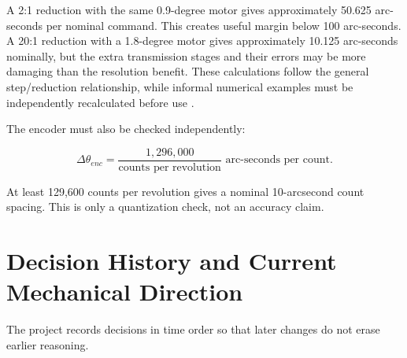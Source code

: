 \documentclass[11pt,a4paper]{article}
\begin{document}
A 2:1 reduction with the same 0.9-degree motor gives approximately 50.625 arc-seconds per nominal command. This creates useful margin below 100 arc-seconds. A 20:1 reduction with a 1.8-degree motor gives approximately 10.125 arc-seconds nominally, but the extra transmission stages and their errors may be more damaging than the resolution benefit. These calculations follow the general step/reduction relationship, while informal numerical examples must be independently recalculated before use \cite{cloudynights}.

The encoder must also be checked independently:

\begin{equation}
\Delta\theta_{enc}=\frac{1,296,000}{\text{counts per revolution}}\text{ arc-seconds per count}.
\end{equation}

At least 129,600 counts per revolution gives a nominal 10-arcsecond count spacing. This is only a quantization check, not an accuracy claim.

\section{Decision History and Current Mechanical Direction}

The project records decisions in time order so that later changes do not erase earlier reasoning.
\end{document}
